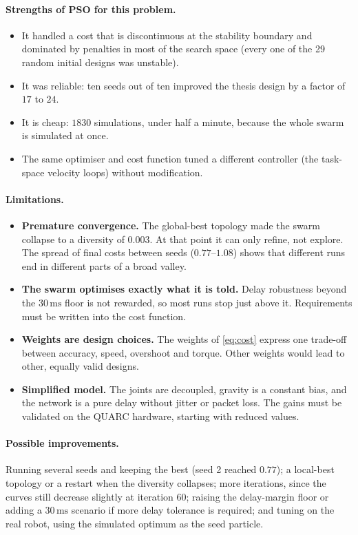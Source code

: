 \documentclass[11pt,a4paper]{article}
\begin{document}
\paragraph{Strengths of PSO for this problem.}
\begin{itemize}[nosep]
  \item It handled a cost that is discontinuous at the stability boundary and dominated by penalties in most
        of the search space (every one of the 29 random initial designs was unstable).
  \item It was reliable: ten seeds out of ten improved the thesis design by a factor of $17$ to $24$.
  \item It is cheap: $1830$ simulations, under half a minute, because the whole swarm is simulated at once.
  \item The same optimiser and cost function tuned a different controller (the task-space velocity loops)
        without modification.
\end{itemize}

\paragraph{Limitations.}
\begin{itemize}
  \item \textbf{Premature convergence.} The global-best topology made the swarm collapse to a diversity of
        $0.003$. At that point it can only refine, not explore. The spread of final costs between seeds
        ($0.77$--$1.08$) shows that different runs end in different parts of a broad valley.
  \item \textbf{The swarm optimises exactly what it is told.} Delay robustness beyond the $30\,\mathrm{ms}$
        floor is not rewarded, so most runs stop just above it. Requirements must be written into the cost
        function.
  \item \textbf{Weights are design choices.} The weights of \eqref{eq:cost} express one trade-off between
        accuracy, speed, overshoot and torque. Other weights would lead to other, equally valid designs.
  \item \textbf{Simplified model.} The joints are decoupled, gravity is a constant bias, and the network is a
        pure delay without jitter or packet loss. The gains must be validated on the QUARC hardware, starting
        with reduced values.
\end{itemize}

\paragraph{Possible improvements.} Running several seeds and keeping the best (seed 2 reached $0.77$);
a local-best topology or a restart when the diversity collapses; more iterations, since the curves still
decrease slightly at iteration 60; raising the delay-margin floor or adding a $30\,\mathrm{ms}$ scenario if
more delay tolerance is required; and tuning on the real robot, using the simulated optimum as the seed
particle.
\end{document}
